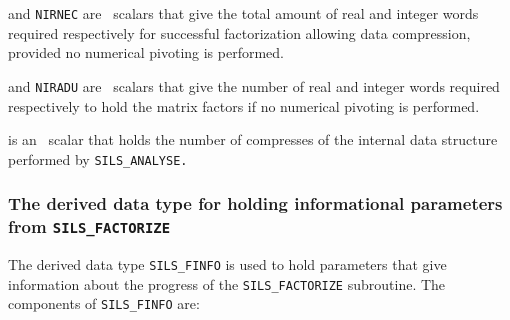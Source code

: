\documentclass{galahad}
\newcommand{\packagename}{SILS}
\begin{document}
\begin{description}
 and {\tt NIRNEC} are \integer\ scalars that give the total 
 amount 
 of real and integer words required respectively for successful 
 factorization allowing data compression, provided no numerical pivoting 
 is performed. 
 
 and {\tt NIRADU} are \integer\ scalars that give the number 
 of real and integer words required respectively to hold the matrix 
 factors if no numerical pivoting is performed. 
 
 is an \integer\ scalar that holds the number of compresses 
 of the internal data structure performed by {\tt \packagename\_AN\-ALYSE.} 

\end{description}


\subsubsection{The derived data type for holding informational
 parameters from {\tt \packagename\_FACTORIZE}}\label{typeinfof}
The derived data type 
{\tt \packagename\_FINFO} 
is used to hold parameters that give information about the progress of the
{\tt \packagename\_FAC\-TORIZE} subroutine. The components of
{\tt \packagename\_FINFO} 
are:
\end{document}
